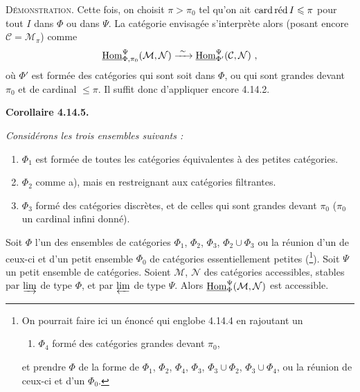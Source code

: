\noindent\textsc{Démonstration}. Cette fois, on choisit $\pi>\pi_0$ tel qu'on ait $\cardred I\leqslant\pi$ pour tout $I$ dans $\Phi$ ou dans $\Psi$. La catégorie envisagée s'interprète alors (posant encore $\mathcal{C}=\mathcal{M}_\pi$) comme
\[
\uHom^{\Psi}_{\Phi,\pi_0}(\mathcal{M},\mathcal{N}) \xrightarrow{\ \sim\ } \uHom^{\Psi}_{\Phi'}(\mathcal{C},\mathcal{N})\ ,
\]
où $\Phi'$ est formée des catégories qui sont soit dans $\Phi$, ou qui sont grandes devant $\pi_0$ et de cardinal $\leqslant\pi$. Il suffit donc d'appliquer encore 4.14.2.

\noindent\textbf{Corollaire 4.14.5.} {\itshape Considérons les trois ensembles suivants :
\begin{enumerate}[leftmargin=2.5em]
\item[\textit{a)}] $\Phi_1$ est formée de toutes les catégories équivalentes à des petites catégories.
\item[\textit{b)}] $\Phi_2$ comme a), mais en restreignant aux catégories filtrantes.
\item[\textit{c)}] $\Phi_3$ formé des catégories discrètes, et de celles qui sont grandes devant $\pi_0$ ($\pi_0$ un cardinal infini donné).
\end{enumerate}
\noindent Soit $\Phi$ l'un des ensembles de catégories $\Phi_1$, $\Phi_2$, $\Phi_3$, $\Phi_2\cup\Phi_3$ ou la réunion d'un de ceux-ci et d'un petit ensemble $\Phi_0$ de catégories essentiellement petites (\footnote[165]{On pourrait faire ici un énoncé qui englobe 4.14.4 en rajoutant un
\begin{enumerate}[leftmargin=2.5em]
\item[d)] $\Phi_4$ formé des catégories grandes devant $\pi_0$,
\end{enumerate}
\noindent et prendre $\Phi$ de la forme de $\Phi_1$, $\Phi_2$, $\Phi_4$, $\Phi_3$, $\Phi_3\cup\Phi_2$, $\Phi_3\cup\Phi_4$, ou la réunion de ceux-ci et d'un $\Phi_0$.}). Soit $\Psi$ un petit ensemble de catégories. Soient $\mathcal{M}$, $\mathcal{N}$ des catégories accessibles, stables par $\varinjlim$ de type $\Phi$, et par $\varprojlim$ de type $\Psi$. Alors $\uHom^{\Psi}_{\Phi}(\mathcal{M},\mathcal{N})$ est accessible.}


